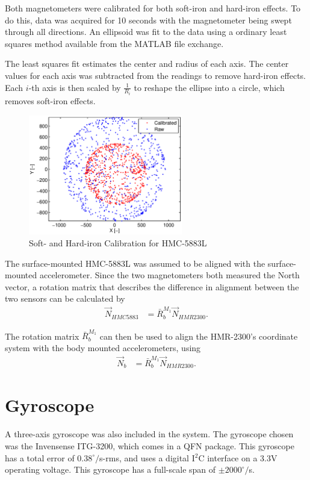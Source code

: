  Both magnetometers were calibrated for both soft-iron and hard-iron effects\cite{magCalibration}. To do this, data was acquired for 10 seconds with the magnetometer being swept through all directions. An ellipsoid was fit to the data using a ordinary least squares method available from the MATLAB file exchange\cite{ellipsoidFit}.
 
 The least squares fit estimates the center and radius of each axis. The center values for each axis was subtracted from the readings to remove hard-iron effects. Each $i$-th axis is then scaled by $\frac{1}{R_i}$ to reshape the ellipse into a circle, which removes soft-iron effects.
 \begin{figure}[H]
   \centering
     \includegraphics[width=0.6\textwidth]{figures/magCalib.eps}
       \caption{Soft- and Hard-iron Calibration for HMC-5883L}
       \label{fig:magCalib}
 \end{figure}
 The surface-mounted HMC-5883L was assumed to be aligned with the surface-mounted accelerometer. Since the two magnetometers both measured the North vector, a rotation matrix that describes the difference in alignment between the two sensors can be calculated by
 \begin{align}
 \label{eqn:magAlign}
\vec{N}_{HMC5883} &= \bar{R}^{M_1}_b\vec{N}_{HMR2300}.
 \end{align}
 
 The rotation matrix $\bar{R}^{M_1}_b$ can then be used to align the HMR-2300's coordinate system with the body mounted accelerometers, using
 \begin{align}
\vec{N}_b &= \bar{R}^{M_1}_b\vec{N}_{HMR2300}.
 \end{align}
 
\section{Gyroscope}
A three-axis gyroscope was also included in the system. The gyroscope chosen was the Invensense ITG-3200, which comes in a QFN package. This gyroscope has a total error of $0.38^\circ/$s-rms\cite{itg3200DataSheet}, and uses a digital I$^2$C interface on a 3.3V operating voltage. This gyroscope has a full-scale span of $\pm2000^\circ/$s.


